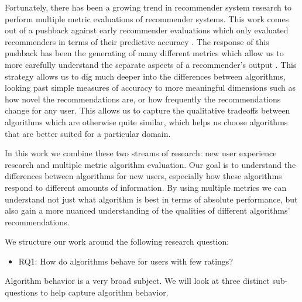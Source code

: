 \documentclass[letterpaper]{sig-alternate}
\begin{document}
  Fortunately, there has been a growing trend in recommender system research to perform multiple metric evaluations of recommender systems.
  This work comes out of a pushback against early recommender evaluations which only evaluated recommenders in terms of their predictive accuracy \cite{accurateIsNotEnough}.
  The response of this pushback has been the generating of many different metrics which allow us to more carefully understand the separate aspects of a recommender's output \cite{LathiaTemporal, CremonesiTopN, zieglerDiversity}.
  This strategy allows us to dig much deeper into the differences between algorithms, looking past simple measures of accuracy to more meaningful dimensions such as how novel the recommendations are, or how frequently the recommendations change for any user.
  This allows us to capture the qualitative tradeoffs between algorithms which are otherwise quite similar, which helps us choose algorithms that are better suited for a particular domain.

  In this work we combine these two streams of research: new user experience research and multiple metric algorithm evaluation.
  Our goal is to understand the differences between algorithms for new users, especially how these algorithms respond to different amounts of information.
  By using multiple metrics we can understand not just what algorithm is best in terms of absolute performance, but also gain a more nuanced understanding of the qualities of different algorithms' recommendations.

  We structure our work around the following research question:
  \begin{itemize}
    \item RQ1: How do algorithms behave for users with few ratings?
  \end{itemize}
  Algorithm behavior is a very broad subject.
  We will look at three distinct sub-questions to help capture algorithm behavior.

      
\end{document}
